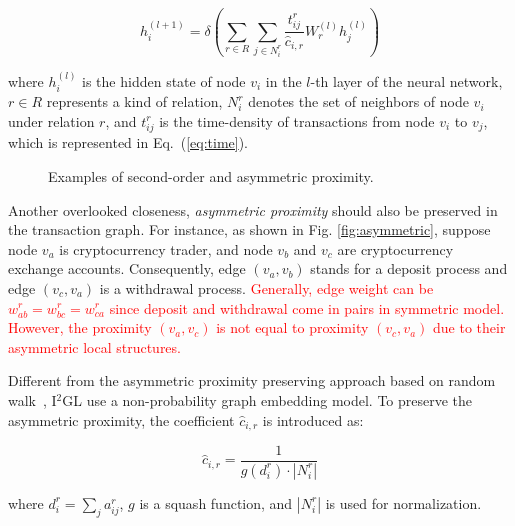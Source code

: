 \begin{equation}
h_i^{(l+1)}=\delta(\sum_{r\in R} \sum_{j \in N_i^r} \frac{t_{ij}^r}{\hat c_{i,r}}W_r^{(l)}h_j^{(l)})
\end{equation}

\noindent where $h_i^{(l)}$ is the hidden state of node $v_i$ in the $l$-th layer of the neural network, $r \in R$ represents a kind of relation, $N_i^r$ denotes the set of neighbors of node $v_i$ under relation $r$, and $t_{ij}^r$ is the time-density of transactions from node $v_i$ to $v_j$, which is represented in Eq.~(\ref{eq:time}).


\begin{figure}[htbp]
	\centering
	\caption{Examples of second-order and asymmetric proximity.}

\end{figure}


Another overlooked closeness, \emph{asymmetric proximity} should also be preserved in the transaction graph. For instance, as shown in Fig. \ref{fig:asymmetric}, suppose node $v_a$ is cryptocurrency trader, and node $v_b$ and $v_c$ are cryptocurrency exchange accounts. Consequently, edge $(v_a,v_b)$ stands for a deposit process and edge $(v_c,v_a)$ is a withdrawal process. \textcolor{red}{Generally, edge weight can be $w^r_{ab}=w^r_{bc}=w^r_{ca}$ since deposit and withdrawal come in pairs in symmetric model. However, the proximity $(v_a,v_c)$ is not equal to proximity $(v_c,v_a)$ due to their asymmetric local structures.}

Different from the asymmetric proximity preserving approach based on random walk~\cite{zhou2017scalable}, I$^2$GL use a non-probability graph embedding model. To preserve the asymmetric proximity, the coefficient $\hat c_{i,r}$ is introduced as:

\begin{equation}
\hat c_{i,r}=\frac{1}{g(d_i^r)\cdot |N_i^r|}
\end{equation}

\noindent where $d_i^r=\sum_{j}a^r_{ij}$, $g$ is a squash function, and $|N_i^r|$ is used for normalization.



